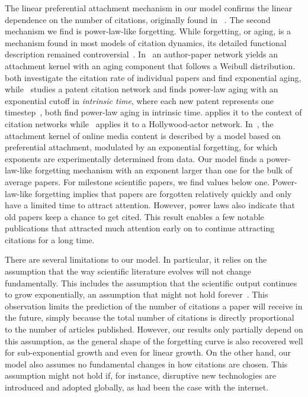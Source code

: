 \documentclass[fleqn,10pt]{wlscirep}
\begin{document}
The linear preferential attachment mechanism in our model confirms the linear dependence on the number of citations, originally found in ~\cite{Jeong_2003}. The second mechanism we find is power-law-like forgetting. While forgetting, or aging, is a mechanism found in most models of citation dynamics, its detailed functional description remained controversial~\cite{Yin2017, Borner2004, Dorogovtsev2000, Valverde2007, Higham2017_2, Safdari2016, Golosovsky2017}. In~\cite{Borner2004} an author-paper network yields an attachment kernel with an aging component that follows a Weibull distribution. \cite{Golosovsky2017, Higham2017_2} both investigate the citation rate of individual papers and find exponential aging, while~\cite{Valverde2007} studies a patent citation network and finds power-law aging with an exponential cutoff in {\em intrinsic time}, where each new patent represents one timestep~\cite{Safdari2016, Dorogovtsev2000},  both find power-law aging in intrinsic time. \cite{Dorogovtsev2000} applies it to the context of citation networks while~\cite{Safdari2016} applies it to a Hollywood-actor network. In~\cite{Lefortier}, the attachment kernel of online media content is described by a model based on preferential attachment, modulated by an exponential forgetting, for which exponents are experimentally determined from data.
Our model finds a power-law-like forgetting mechanism with an exponent larger than one for the bulk of average papers. For milestone scientific papers, we find values below one. Power-law-like forgetting implies that papers are forgotten relatively quickly and only have a limited time to attract attention. However, power laws also indicate that old papers keep a chance to get cited. This result enables a few notable publications that attracted much attention early on to continue attracting citations for a long time. 

There are several limitations to our model. In particular, it relies on the assumption that the way scientific literature evolves will not change fundamentally. This includes the assumption that the scientific output continues to grow exponentially, an assumption that might not hold forever~\cite{Brown2011}. This observation limits the prediction of the number of citations a paper will receive in the future, simply because the total number of citations is directly proportional to the number of articles published. However, our results only partially depend on this assumption, as the general shape of the forgetting curve is also recovered well for sub-exponential growth and even for linear growth. On the other hand, our model also assumes no fundamental changes in how citations are chosen. This assumption might not hold if, for instance, disruptive new technologies are introduced and adopted globally, as had been the case with the internet.
\end{document}

